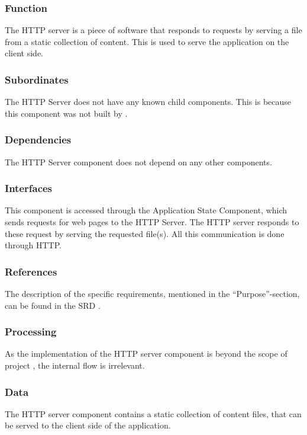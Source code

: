 \noindent {}

\subsubsection*{Function}
The HTTP server is a piece of software that responds to requests by serving a file from a static collection of content. This is used to serve the application on the client side.

\subsubsection*{Subordinates}
The HTTP Server does not have any known child components. This is because this component was not built by \projectauthor.

\subsubsection*{Dependencies}
The HTTP Server component does not depend on any other components.

\subsubsection*{Interfaces}
This component is accessed through the Application State Component, which sends requests for web pages to the HTTP Server. The HTTP server responds to these request by serving the requested file(s). All this communication is done through HTTP.

\subsubsection*{References}
The description of the specific requirements, mentioned in the ``Purpose''-section, can be found in the SRD \cite{srd}.

\subsubsection*{Processing}
As the implementation of the HTTP server component is beyond the scope of project \projectname, the internal flow is irrelevant.

\subsubsection*{Data}
The HTTP server component contains a static collection of content files, that can be served to the client side of the application.

